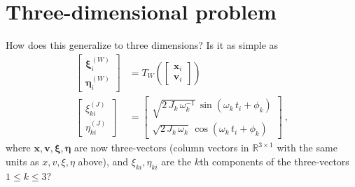 \documentclass{article}
\begin{document}
\section{Three-dimensional problem}
How does this generalize to three dimensions?
Is it as simple as
\begin{align}
    \begin{bmatrix}\boldsymbol{\xi}^{(W)}_i \\ \boldsymbol{\eta}^{(W)}_i\end{bmatrix} &= T_W(\begin{bmatrix}\boldsymbol{x}_i \\ \boldsymbol{v}_i\end{bmatrix}) \\
    \begin{bmatrix}\xi^{(J)}_{ki} \\ \eta^{(J)}_{ki}\end{bmatrix} &= \begin{bmatrix}\sqrt{2\,J_k\,\omega_k^{-1}}\,\sin(\omega_k\,t_i+\phi_k) \\ \sqrt{2\,J_k\,\omega_k}\,\cos(\omega_k\,t_i+\phi_k)\end{bmatrix} ~,
\end{align}
where $\boldsymbol{x}, \boldsymbol{v}, \boldsymbol{\xi}, \boldsymbol{\eta}$ are now three-vectors (column vectors in $\mathbb{R}^{3\times 1}$ with the same units as $x, v, \xi, \eta$ above),
and $\xi_{ki}, \eta_{ki}$ are the $k$th components of the three-vectors $1\leq k\leq 3$?
\end{document}
